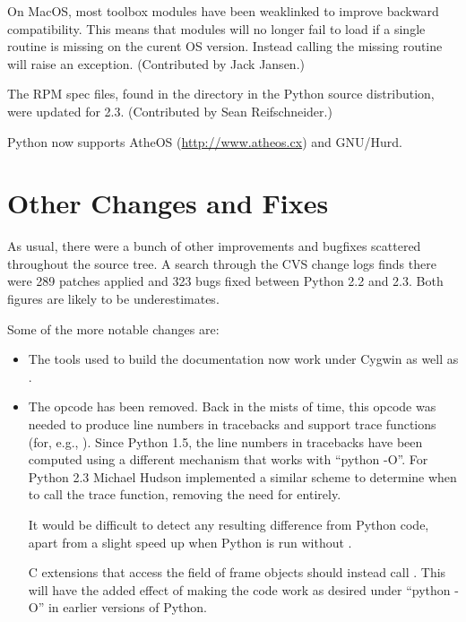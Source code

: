 \documentclass{howto}
\begin{document}
On MacOS, most toolbox modules have been weaklinked to improve
backward compatibility.  This means that modules will no longer fail
to load if a single routine is missing on the curent OS version.
Instead calling the missing routine will raise an exception.
(Contributed by Jack Jansen.)

The RPM spec files, found in the  directory in the
Python source distribution, were updated for 2.3.  (Contributed by
Sean Reifschneider.)

Python now supports AtheOS (\url{http://www.atheos.cx}) and GNU/Hurd.


\section{Other Changes and Fixes}

As usual, there were a bunch of other improvements and bugfixes
scattered throughout the source tree.  A search through the CVS change
logs finds there were 289 patches applied and 323 bugs fixed between
Python 2.2 and 2.3.  Both figures are likely to be underestimates.

Some of the more notable changes are:

\begin{itemize}

\item The tools used to build the documentation now work under Cygwin
as well as \UNIX.

\item The  opcode has been removed.  Back in the
mists of time, this opcode was needed to produce line numbers in
tracebacks and support trace functions (for, e.g., ).
Since Python 1.5, the line numbers in tracebacks have been computed
using a different mechanism that works with ``python -O''.  For Python
2.3 Michael Hudson implemented a similar scheme to determine when to
call the trace function, removing the need for 
entirely.

It would be difficult to detect any resulting difference from Python
code, apart from a slight speed up when Python is run without
.

C extensions that access the  field of frame objects
should instead call .
This will have the added effect of making the code work as desired
under ``python -O'' in earlier versions of Python.

\end{itemize}
\end{document}
